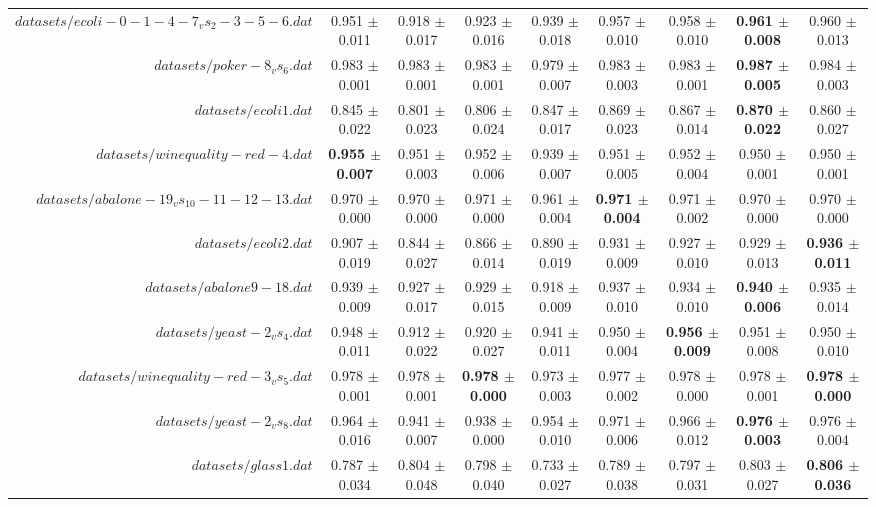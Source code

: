 \begin{table}[!ht]
{\begin{tabular}{r c c c c c c c c}
$datasets/ecoli-0-1-4-7_vs_2-3-5-6.dat$ & 0.951 $\pm$ 0.011 & 0.918 $\pm$ 0.017 & 0.923 $\pm$ 0.016 & 0.939 $\pm$ 0.018 & 0.957 $\pm$ 0.010 & 0.958 $\pm$ 0.010 & \textbf{0.961 $\pm$ 0.008} & 0.960 $\pm$ 0.013 \\
$datasets/poker-8_vs_6.dat$ & 0.983 $\pm$ 0.001 & 0.983 $\pm$ 0.001 & 0.983 $\pm$ 0.001 & 0.979 $\pm$ 0.007 & 0.983 $\pm$ 0.003 & 0.983 $\pm$ 0.001 & \textbf{0.987 $\pm$ 0.005} & 0.984 $\pm$ 0.003 \\
$datasets/ecoli1.dat$ & 0.845 $\pm$ 0.022 & 0.801 $\pm$ 0.023 & 0.806 $\pm$ 0.024 & 0.847 $\pm$ 0.017 & 0.869 $\pm$ 0.023 & 0.867 $\pm$ 0.014 & \textbf{0.870 $\pm$ 0.022} & 0.860 $\pm$ 0.027 \\
$datasets/winequality-red-4.dat$ & \textbf{0.955 $\pm$ 0.007} & 0.951 $\pm$ 0.003 & 0.952 $\pm$ 0.006 & 0.939 $\pm$ 0.007 & 0.951 $\pm$ 0.005 & 0.952 $\pm$ 0.004 & 0.950 $\pm$ 0.001 & 0.950 $\pm$ 0.001 \\
$datasets/abalone-19_vs_10-11-12-13.dat$ & 0.970 $\pm$ 0.000 & 0.970 $\pm$ 0.000 & 0.971 $\pm$ 0.000 & 0.961 $\pm$ 0.004 & \textbf{0.971 $\pm$ 0.004} & 0.971 $\pm$ 0.002 & 0.970 $\pm$ 0.000 & 0.970 $\pm$ 0.000 \\
$datasets/ecoli2.dat$ & 0.907 $\pm$ 0.019 & 0.844 $\pm$ 0.027 & 0.866 $\pm$ 0.014 & 0.890 $\pm$ 0.019 & 0.931 $\pm$ 0.009 & 0.927 $\pm$ 0.010 & 0.929 $\pm$ 0.013 & \textbf{0.936 $\pm$ 0.011} \\
$datasets/abalone9-18.dat$ & 0.939 $\pm$ 0.009 & 0.927 $\pm$ 0.017 & 0.929 $\pm$ 0.015 & 0.918 $\pm$ 0.009 & 0.937 $\pm$ 0.010 & 0.934 $\pm$ 0.010 & \textbf{0.940 $\pm$ 0.006} & 0.935 $\pm$ 0.014 \\
$datasets/yeast-2_vs_4.dat$ & 0.948 $\pm$ 0.011 & 0.912 $\pm$ 0.022 & 0.920 $\pm$ 0.027 & 0.941 $\pm$ 0.011 & 0.950 $\pm$ 0.004 & \textbf{0.956 $\pm$ 0.009} & 0.951 $\pm$ 0.008 & 0.950 $\pm$ 0.010 \\
$datasets/winequality-red-3_vs_5.dat$ & 0.978 $\pm$ 0.001 & 0.978 $\pm$ 0.001 & \textbf{0.978 $\pm$ 0.000} & 0.973 $\pm$ 0.003 & 0.977 $\pm$ 0.002 & 0.978 $\pm$ 0.000 & 0.978 $\pm$ 0.001 & \textbf{0.978 $\pm$ 0.000} \\
$datasets/yeast-2_vs_8.dat$ & 0.964 $\pm$ 0.016 & 0.941 $\pm$ 0.007 & 0.938 $\pm$ 0.000 & 0.954 $\pm$ 0.010 & 0.971 $\pm$ 0.006 & 0.966 $\pm$ 0.012 & \textbf{0.976 $\pm$ 0.003} & 0.976 $\pm$ 0.004 \\
$datasets/glass1.dat$ & 0.787 $\pm$ 0.034 & 0.804 $\pm$ 0.048 & 0.798 $\pm$ 0.040 & 0.733 $\pm$ 0.027 & 0.789 $\pm$ 0.038 & 0.797 $\pm$ 0.031 & 0.803 $\pm$ 0.027 & \textbf{0.806 $\pm$ 0.036} \\

\end{tabular}}
\end{table}
